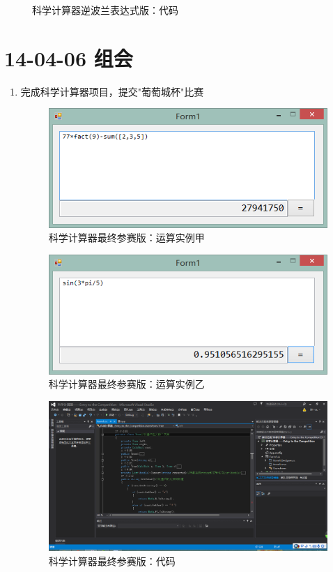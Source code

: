 \documentclass[]{report}
\begin{document}
\begin{enumerate}
\begin{figure}
\caption{科学计算器逆波兰表达式版：代码}
\label{fig:CalcP2}
\end{figure}
\end{enumerate}
\section{14-04-06 组会}
\begin{enumerate}
	\item 完成科学计算器项目，提交"葡萄城杯"比赛
\begin{figure}
\centering
\includegraphics[width=0.7\linewidth]{./PIC/CalcEC0}
\caption{科学计算器最终参赛版：运算实例甲}
\label{fig:CalcEC0}
\end{figure}
\begin{figure}
\centering
\includegraphics[width=0.7\linewidth]{./PIC/CalcEC1}
\caption{科学计算器最终参赛版：运算实例乙}
\label{fig:CalcEC1}
\end{figure}
\begin{figure}
\centering
\includegraphics[width=1\linewidth]{./PIC/CalcEC2}
\caption{科学计算器最终参赛版：代码}
\label{fig:CalcEC2}
\end{figure}

\end{enumerate}	
\end{document}
